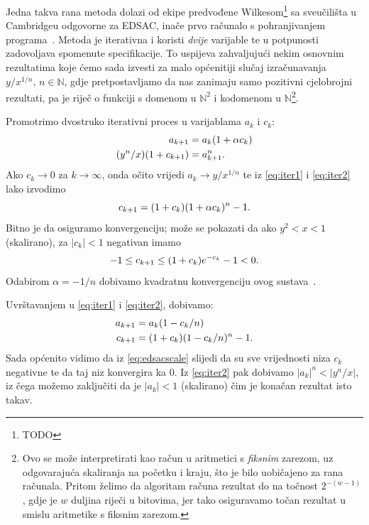 \documentclass[12pt]{scrartcl}
\begin{document}
Jedna takva rana metoda dolazi od ekipe predvođene Wilkesom\footnote{TODO} sa sveučilišta u Cambridgeu odgovorne za EDSAC,
inače prvo računalo s pohranjivanjem programa~\cite[str.~32]{ribaric}. Metoda je iterativna i koristi \emph{dvije} varijable te 
u potpunosti zadovoljava spomenute specifikacije. To uspijeva zahvaljujući nekim osnovnim rezultatima koje ćemo sada izvesti za
malo općenitiji slučaj izračunavanja $y/x^{1/n},\,n\in\mathbb{N}$, gdje pretpostavljamo da nas zanimaju samo pozitivni cjelobrojni rezultati, pa
je riječ o funkciji s domenom u $\mathbb{N}^2$ i kodomenom u $\mathbb N$\footnote{Ovo se može interpretirati kao račun u aritmetici
s \emph{fiksnim} zarezom, uz odgovarajuća skaliranja na početku i kraju, što je bilo uobičajeno za rana računala. Pritom želimo da algoritam
računa rezultat do na točnost $2^{-(w-1)}$, gdje je $w$ duljina riječi u bitovima, jer tako osiguravamo točan rezultat u smislu aritmetike
s fiksnim zarezom.}.

Promotrimo dvostruko iterativni proces u varijablama $a_k$ i $c_k$:
\begin{align}
        a_{k+1} &= a_k(1 + \alpha c_k)\label{eq:iter1}\\
        (y^n / x)(1 + c_{k+1}) &= a^n_{k+1}\label{eq:iter2}\text.
\end{align}
Ako $c_k\to 0$ za $k\to\infty$, onda očito vrijedi $a_k\to y/x^{1/n}$ te iz \eqref{eq:iter1} i \eqref{eq:iter2} lako izvodimo
\begin{equation}
    c_{k+1} = (1+c_k)(1+\alpha c_k)^n - 1\text.
\end{equation}
Bitno je da osiguramo konvergenciju; može se pokazati da ako $y^2<x<1$ (skalirano), za $|c_k|<1$ negativan imamo
\begin{equation}\label{eq:edsacscale}
    -1\leq c_{k+1}\leq(1+c_k)e^{-c_k}-1<0\text.
\end{equation}
Odabirom $\alpha=-1/n$ dobivamo kvadratnu konvergenciju ovog sustava~\cite{gower}.

Uvrštavanjem u \eqref{eq:iter1} i \eqref{eq:iter2}, dobivamo:
\begin{align}
    a_{k+1} &= a_k(1-c_k/n)\\
    c_{k+1} &= (1+c_k)(1-c_k/n)^n - 1\text.
\end{align}
Sada općenito vidimo da iz \eqref{eq:edsacscale} slijedi
da su sve vrijednosti niza $c_k$ negativne te da taj niz konvergira ka $0$. Iz \eqref{eq:iter2} pak dobivamo
$|a_k|^n<|y^n/x|$, iz čega možemo zaključiti da je $|a_k|<1$ (skalirano) čim je konačan rezultat isto takav.
\end{document}
